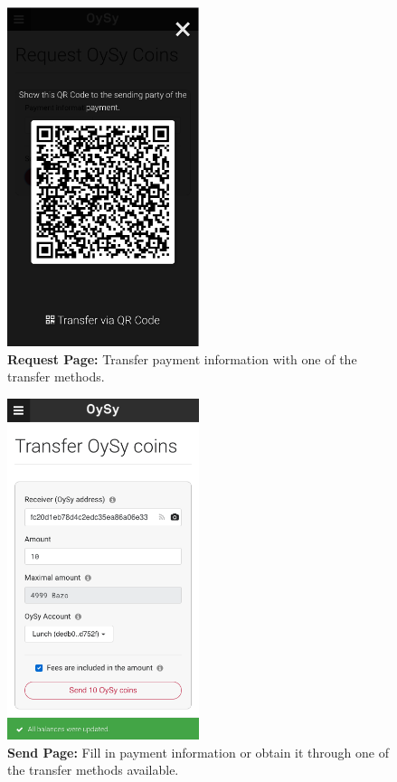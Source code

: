 \begin{figure}
\centering
\includegraphics[width=0.5\textwidth]{screenshots/Request-2.png}
\caption{\label{fig:uirequest2}\textbf{Request Page:} Transfer payment information with one of the transfer methods.}
\end{figure}

\begin{figure}
\centering
\includegraphics[width=0.5\textwidth]{screenshots/Send-1.png}
\caption{\label{fig:uisend1}\textbf{Send Page:} Fill in payment information or obtain it through one of the transfer methods available.}
\end{figure}

